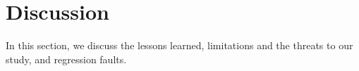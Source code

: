 \section{Discussion}
\label{sec:discuss}
In this section, we discuss the lessons learned, limitations and the threats to our study, and regression faults.



	



	
	
	
	
